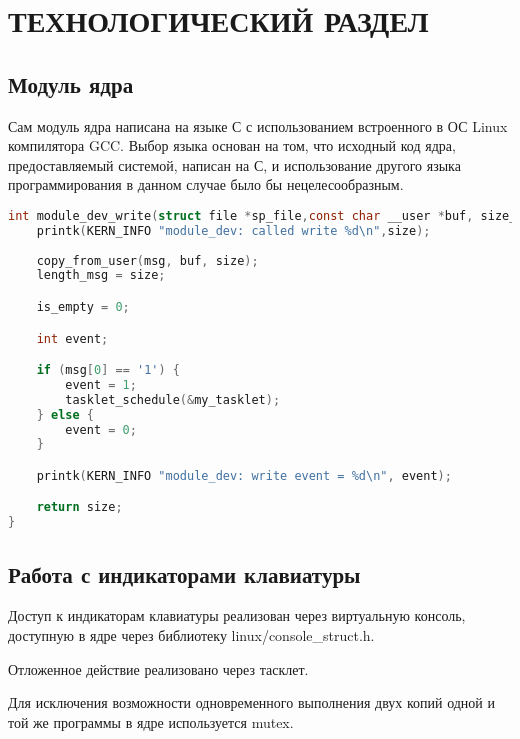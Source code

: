 \chapter{ТЕХНОЛОГИЧЕСКИЙ РАЗДЕЛ}

\section{Модуль ядра}

Сам модуль ядра написана на языке С с использованием встроенного в ОС Linux компилятора GCC. Выбор языка основан на том, что исходный код ядра, предоставляемый системой, написан на С,  и использование другого языка программирования в данном случае было бы нецелесообразным. 

\begin{lstlisting}[language=C, caption={Функция, обрабатывающая запись в специальный файл},label=module_dev_write]
int module_dev_write(struct file *sp_file,const char __user *buf, size_t size, loff_t *offset) {
	printk(KERN_INFO "module_dev: called write %d\n",size);
	
	copy_from_user(msg, buf, size);
	length_msg = size;

	is_empty = 0;

	int event;

	if (msg[0] == '1') {
		event = 1;
  		tasklet_schedule(&my_tasklet);
	} else {
		event = 0;
	}

	printk(KERN_INFO "module_dev: write event = %d\n", event);

	return size;
}
\end{lstlisting}

\section{Работа с индикаторами клавиатуры}

Доступ к индикаторам клавиатуры реализован через виртуальную консоль, доступную в ядре через библиотеку linux/console\_struct.h.

Отложенное действие реализовано через тасклет. 

Для исключения возможности одновременного выполнения двух копий одной и той же программы в ядре используется mutex.

